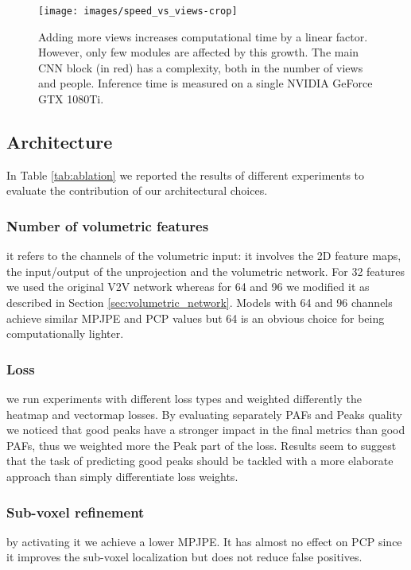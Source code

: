 \documentclass[a4paper,conference]{IEEEtran}
\begin{document}
\begin{figure}[!t]
\texttt{[image: images/speed\_vs\_views-crop]}
\caption{Adding more views increases computational time by a linear factor. However, only few modules are affected by this growth. The main CNN block (in red) has a  complexity, both in the number of views and people. Inference time is measured on a single NVIDIA GeForce GTX 1080Ti.}
\label{fig:speed}
\end{figure}

\subsection{Architecture}
In Table \ref{tab:ablation} we reported the results of different experiments to evaluate the contribution of our architectural choices.

\subsubsection{Number of volumetric features} 
it refers to the channels of the volumetric input: it involves the 2D feature maps, the input/output of the unprojection  and the volumetric network. For 32 features we used the original V2V network whereas for 64 and 96 we modified it as described in Section \ref{sec:volumetric_network}. Models with 64 and 96 channels achieve similar MPJPE and PCP values but 64 is an obvious choice for being computationally lighter.

\subsubsection{Loss} 
we run experiments with different loss types and weighted differently the heatmap and vectormap losses. By evaluating separately PAFs and Peaks quality we noticed that good peaks have a stronger impact in the final metrics than good PAFs, thus we weighted more the Peak part of the loss. Results seem to suggest that the task of predicting good peaks should be tackled with a more elaborate approach than simply differentiate loss weights.

\subsubsection{Sub-voxel refinement} 
by activating it we achieve a lower MPJPE. It has almost no effect on PCP since it improves the sub-voxel localization but does not reduce false positives.
\end{document}

